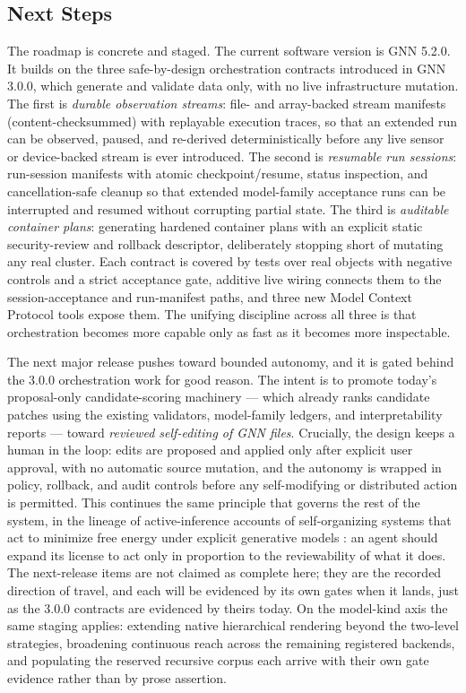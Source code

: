 \documentclass[
  english,
  9pt,
]{extarticle}
\begin{document}
\subsection{Next Steps}\label{next-steps}

The roadmap is concrete and staged. The current software version is GNN
5.2.0. It builds on the three safe-by-design orchestration contracts
introduced in GNN 3.0.0, which generate and validate data only, with no
live infrastructure mutation. The first is \emph{durable observation
streams}: file- and array-backed stream manifests (content-checksummed)
with replayable execution traces, so that an extended run can be
observed, paused, and re-derived deterministically before any live
sensor or device-backed stream is ever introduced. The second is
\emph{resumable run sessions}: run-session manifests with atomic
checkpoint/resume, status inspection, and cancellation-safe cleanup so
that extended model-family acceptance runs can be interrupted and
resumed without corrupting partial state. The third is \emph{auditable
container plans}: generating hardened container plans with an explicit
static security-review and rollback descriptor, deliberately stopping
short of mutating any real cluster. Each contract is covered by tests
over real objects with negative controls and a strict acceptance gate,
additive live wiring connects them to the session-acceptance and
run-manifest paths, and three new Model Context Protocol tools expose
them. The unifying discipline across all three is that orchestration
becomes more capable only as fast as it becomes more inspectable.

The next major release pushes toward bounded autonomy, and it is gated
behind the 3.0.0 orchestration work for good reason. The intent is to
promote today's proposal-only candidate-scoring machinery --- which
already ranks candidate patches using the existing validators,
model-family ledgers, and interpretability reports --- toward
\emph{reviewed self-editing of GNN files}. Crucially, the design keeps a
human in the loop: edits are proposed and applied only after explicit
user approval, with no automatic source mutation, and the autonomy is
wrapped in policy, rollback, and audit controls before any
self-modifying or distributed action is permitted. This continues the
same principle that governs the rest of the system, in the lineage of
active-inference accounts of self-organizing systems that act to
minimize free energy under explicit generative models
\citep{friston2010, parr2022}: an agent should expand its license to act
only in proportion to the reviewability of what it does. The
next-release items are not claimed as complete here; they are the
recorded direction of travel, and each will be evidenced by its own
gates when it lands, just as the 3.0.0 contracts are evidenced by theirs
today. On the model-kind axis the same staging applies: extending native
hierarchical rendering beyond the two-level strategies, broadening
continuous reach across the remaining registered backends, and
populating the reserved recursive corpus each arrive with their own gate
evidence rather than by prose assertion.
\end{document}

